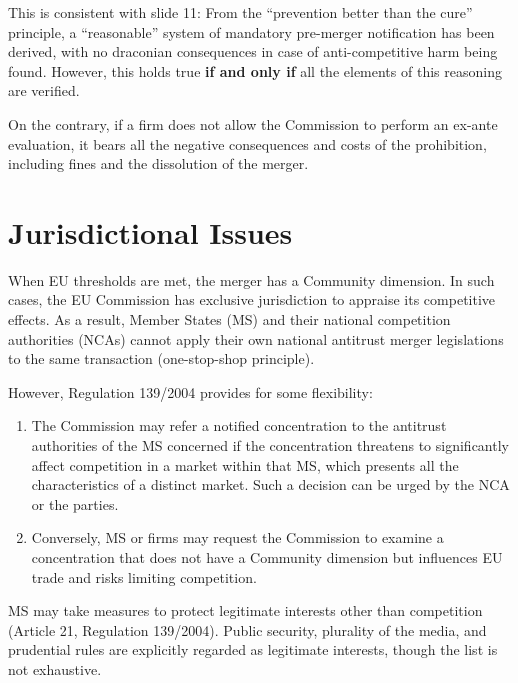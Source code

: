         This is consistent with slide 11: From the “prevention better than the cure” principle, a “reasonable” system of mandatory pre-merger notification has been derived, with no draconian consequences in case of anti-competitive harm being found. However, this holds true \textbf{if and only if} all the elements of this reasoning are verified.
    
        On the contrary, if a firm does not allow the Commission to perform an ex-ante evaluation, it bears all the negative consequences and costs of the prohibition, including fines and the dissolution of the merger.

\section{Jurisdictional Issues}

    When EU thresholds are met, the merger has a Community dimension. In such cases, the EU Commission has exclusive jurisdiction to appraise its competitive effects. As a result, Member States (MS) and their national competition authorities (NCAs) cannot apply their own national antitrust merger legislations to the same transaction (one-stop-shop principle).
        
    However, Regulation 139/2004 provides for some flexibility:
        \begin{enumerate}
            \item The Commission may refer a notified concentration to the antitrust authorities of the MS concerned if the concentration threatens to significantly affect competition in a market within that MS, which presents all the characteristics of a distinct market. Such a decision can be urged by the NCA or the parties.
            \item Conversely, MS or firms may request the Commission to examine a concentration that does not have a Community dimension but influences EU trade and risks limiting competition.
        \end{enumerate}
    
    MS may take measures to protect legitimate interests other than competition (Article 21, Regulation 139/2004). Public security, plurality of the media, and prudential rules are explicitly regarded as legitimate interests, though the list is not exhaustive.
    

